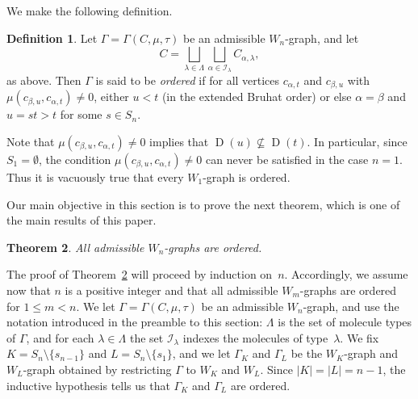 \documentclass[10pt]{amsart}
\newtheorem{theo}{Theorem}[section]
\theoremstyle{definition}
\newtheorem{defi}[theo]{Definition}
\DeclareMathOperator{\D}{D}
\begin{document}
We make the following definition.
\begin{defi}\label{orderedWgraphdef}
Let $\Gamma=\Gamma(C,\mu,\tau)$ be an admissible $W_n$-graph, and let
\begin{equation*}
C=\bigsqcup_{\lambda\in\Lambda}\bigsqcup_{\alpha\in\mathcal{I}_{\lambda}}C_{\alpha,\lambda},
\end{equation*}
as above. Then $\Gamma$ is said to be \emph{ordered}
if for all vertices $c_{\alpha,t}$ and $c_{\beta,u}$ with
$\mu(c_{\beta,u},c_{\alpha,t})\neq 0$, either $u<t$ (in the extended
Bruhat order) or else $\alpha=\beta$ and $u=st>t$ for some $s\in S_n$.
\end{defi}

Note that $\mu(c_{\beta,u},c_{\alpha,t})\neq 0$
implies that $\D(u)\nsubseteq\D(t)$. In particular, since $S_1=\emptyset$,
the condition $\mu(c_{\beta,u},c_{\alpha,t})\neq 0$ can never be satisfied
in the case $n=1$. Thus it is vacuously true that every $W_1$-graph is ordered.

Our main objective in this section is to prove the next theorem, which is
one of the main results of this paper.

\begin{theo}\label{inductivestep}
All admissible $W_n$-graphs are ordered.
\end{theo}

The proof of Theorem~\ref{inductivestep} will proceed by induction on~$n$.
Accordingly, we assume now that $n$ is a positive integer and that all admissible
$W_m$-graphs are ordered for $1\leqslant m<n$.
We let $\Gamma=\Gamma(C,\mu,\tau)$ be an admissible $W_n$-graph, and use the
notation introduced in the preamble to this section: $\Lambda$ is the set of molecule
types of $\Gamma$, and for each $\lambda\in\Lambda$ the set $\mathcal{I}_\lambda$
indexes the molecules of type~$\lambda$. We fix $K=S_n\setminus\{s_{n-1}\}$ and
$L=S_n\setminus\{s_1\}$, and we let $\Gamma_K$
and $\Gamma_L$ be the $W_K$-graph and $W_L$-graph obtained by restricting
$\Gamma$ to $W_K$ and $W_L$. Since $|K|=|L|=n-1$, the
inductive hypothesis tells us that $\Gamma_K$ and $\Gamma_L$ are ordered.
\end{document}
